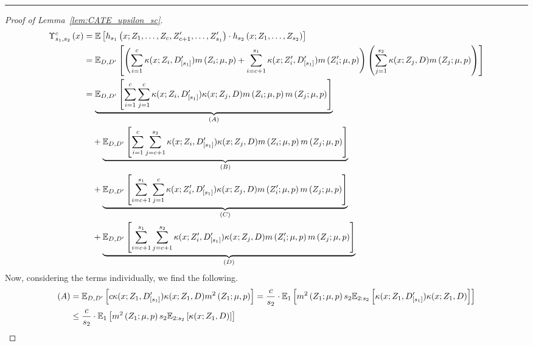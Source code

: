 \hrule
\begin{proof}[Proof of Lemma~\ref{lem:CATE_upsilon_sc}]
	\begin{equation}
		\begin{aligned}
			\Upsilon_{s_1, s_2}^{c}\left(x\right)
			& = \mathbb{E}\left[h_{s_1}\left(x; Z_1, \ldots, Z_c, Z^{\prime}_{c+1}, \ldots,  Z^{\prime}_{s_1}\right) \cdot
			h_{s_2}\left(x; Z_1, \ldots, Z_{s_2}\right)\right] \\
			& = \mathbb{E}_{D, D^{\prime}}\left[
				\left(\sum_{i = 1}^{c}\kappa(x; Z_{i}, D_{[s_1]}^{\prime}) m\left(Z_{i}; \mu, p\right) 
				+ \sum_{i = c+1}^{s_1}\kappa(x; Z_{i}^{\prime}, D_{[s_1]}^{\prime}) m\left(Z_{i}^{\prime}; \mu, p\right)\right)
				\left(\sum_{j = 1}^{s_2} \kappa(x; Z_{j}, D) m\left(Z_{j}; \mu, p\right)\right)\right]\\
			& = \underbrace{\mathbb{E}_{D, D^{\prime}}\left[\sum_{i = 1}^{c}\sum_{j = 1}^{c} \kappa(x; Z_{i}, D_{[s_1]}^{\prime})\kappa(x; Z_{j}, D) m\left(Z_{i}; \mu, p\right) m\left(Z_{j}; \mu, p\right)\right]}_{(A)} \\
			& \quad + \underbrace{\mathbb{E}_{D, D^{\prime}}\left[\sum_{i = 1}^{c}\sum_{j = c+1}^{s_2} \kappa(x; Z_{i}, D_{[s_1]}^{\prime})\kappa(x; Z_{j}, D) m\left(Z_{i}; \mu, p\right) m\left(Z_{j}; \mu, p\right)\right]}_{(B)} \\
			& \quad + \underbrace{\mathbb{E}_{D, D^{\prime}}\left[\sum_{i = c+1}^{s_1}\sum_{j = 1}^{c}\kappa(x; Z_{i}^{\prime}, D_{[s_1]}^{\prime}) \kappa(x; Z_{j}, D) m\left(Z_{i}^{\prime}; \mu, p\right) m\left(Z_{j}; \mu, p\right)\right]}_{(C)} \\
			& \quad + \underbrace{\mathbb{E}_{D, D^{\prime}}\left[\sum_{i = c+1}^{s_1}\sum_{j = c+1}^{s_2}\kappa(x; Z_{i}^{\prime}, D_{[s_1]}^{\prime}) \kappa(x; Z_{j}, D) m\left(Z_{i}^{\prime}; \mu, p\right) m\left(Z_{j}; \mu, p\right)\right]}_{(D)}
		\end{aligned}
	\end{equation}
	\newpage
	Now, considering the terms individually, we find the following.
	\begin{equation}
		\begin{aligned}
			(A)
			& = \E_{D, D^{\prime}}\left[c \kappa(x; Z_{1}, D_{[s_1]}^{\prime})\kappa(x; Z_{1}, D) m^2\left(Z_{1}; \mu, p\right)\right]
			= \frac{c}{s_2} \cdot \E_{1}\left[m^2\left(Z_{1}; \mu, p\right) s_2 \E_{2:s_2}\left[\kappa(x; Z_{1}, D_{[s_1]}^{\prime})\kappa(x; Z_{1}, D)\right] \right]\\
			& \leq  \frac{c}{s_2} \cdot \E_{1}\left[m^2\left(Z_{1}; \mu, p\right) s_2 \E_{2:s_2}\left[\kappa(x; Z_{1}, D)\right] \right]

\end{aligned}
\end{equation}
\end{proof}
